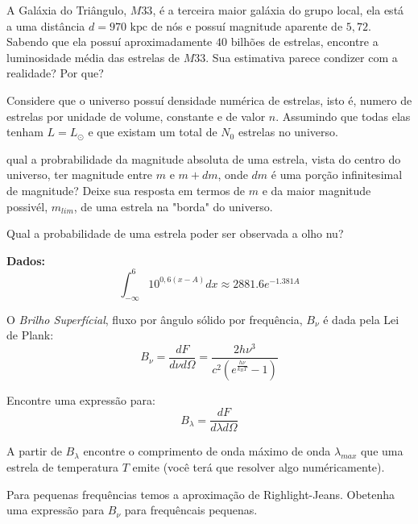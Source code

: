 \documentclass[11pt]{article}
\begin{document}
\begin{pproblem} A Galáxia do Triângulo, \(M33\), é a terceira maior galáxia do grupo local, ela está a uma distância \(d=970 \text{ kpc}\) de nós e possuí magnitude aparente de \(5,72\). Sabendo que ela possuí aproximadamente \(40\) bilhões de estrelas, encontre a luminosidade média das estrelas de \(M33\). Sua estimativa parece condizer com a realidade? Por que?
\end{pproblem}

\begin{pproblem}
    Considere que o universo possuí densidade numérica de estrelas, isto é, numero de estrelas por unidade de volume, constante e de valor \(n\). Assumindo que todas elas tenham \(L = L_\odot\) e que existam um total de \(N_0\) estrelas no universo.
    
    \begin{alternativas}
    \item qual a probrabilidade da magnitude absoluta de uma estrela, vista do centro do universo, ter magnitude entre \(m\) e \(m+dm\), onde \(dm\) é uma porção infinitesimal de magnitude? Deixe sua resposta em termos de \(m\) e da maior magnitude possivél, \(m_{lim}\), de uma estrela na "borda" do universo.

    \item Qual a probabilidade de uma estrela poder ser observada a olho nu?
    
    \textbf{Dados:} \[\int_{-\infty}^{6}10^{0,6(x-A)}dx \approx 2881.6 e^{-1.381 A}\]
    \end{alternativas}
\end{pproblem}

\begin{pproblem}
    O \textit{Brilho Superfícial}, fluxo por ângulo sólido por frequência, \(B_\nu\) é dada pela Lei de Plank:
    \[B_\nu = \frac{dF}{d\nu d\Omega} = \frac{2h\nu^3}{c^2(e^{\frac{h\nu}{k_BT}}-1)}\] 
    \begin{alternativas}
        \item Encontre uma expressão para:
        \[B_\lambda = \frac{dF}{d\lambda d\Omega}\]
        \item A partir de \(B_\lambda\) encontre o comprimento de onda máximo de onda \(\lambda_{max}\) que uma estrela de temperatura \(T\) emite (você terá que resolver algo numéricamente).
        \item Para pequenas frequências temos a aproximação de Righlight-Jeans. Obetenha uma expressão para \(B_\nu\) para frequêncais pequenas.
        \end{alternativas}


\end{pproblem}
\end{document}
